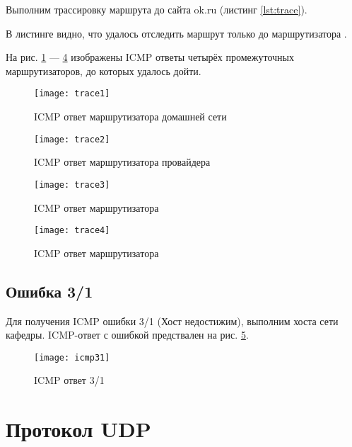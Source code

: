 Выполним трассировку маршрута до сайта ok.ru (листинг \ref{lst:trace}).



В листинге видно, что удалось отследить маршрут только до маршрутизатора .

На рис. \ref{fig:trace1} --- \ref{fig:trace4} изображены ICMP ответы четырёх промежуточных маршрутизаторов, до которых удалось дойти.

\begin{figure}[H]
	\centering
	\texttt{[image: trace1]}
	\caption{ICMP ответ маршрутизатора домашней сети}
	\label{fig:trace1}
\end{figure}

\begin{figure}[H]
	\centering
	\texttt{[image: trace2]}
	\caption{ICMP ответ маршрутизатора провайдера }
	\label{fig:trace2}
\end{figure}

\begin{figure}[H]
	\centering
	\texttt{[image: trace3]}
	\caption{ICMP ответ маршрутизатора }
	\label{fig:trace3}
\end{figure}

\begin{figure}[H]
	\centering
	\texttt{[image: trace4]}
	\caption{ICMP ответ маршрутизатора }
	\label{fig:trace4}
\end{figure}

\subsection{Ошибка 3/1}

Для получения ICMP ошибки 3/1 (Хост недостижим), выполним  хоста  сети кафедры. ICMP-ответ с ошибкой предствален на рис. \ref{fig:icmp31}.

\begin{figure}[H]
	\centering
	\texttt{[image: icmp31]}
	\caption{ICMP ответ 3/1}
	\label{fig:icmp31}
\end{figure}

\newpage

\section{Протокол UDP}


